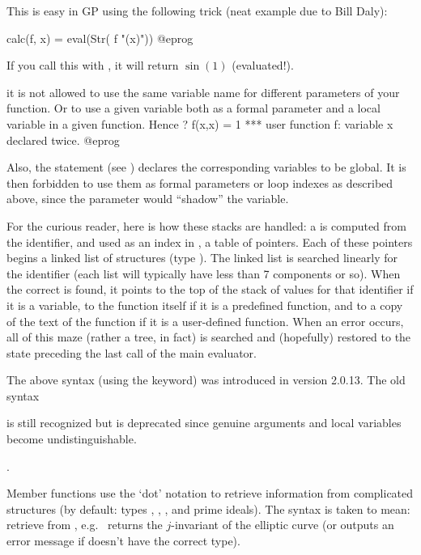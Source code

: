  This is easy
in GP using the following trick (neat example due to Bill Daly):

\bprog
calc(f, x) = eval(Str( f "(x)"))
@eprog

\noindent If you call this with , it will
return $\sin(1)$ (evaluated!).

 it is not allowed to use the same
variable name for different parameters of your function. Or to use a given
variable both as a formal parameter and a local variable in a given function.
Hence
\bprog
? f(x,x) = 1
  ***   user function f: variable x declared twice.
@eprog

Also, the statement  (see
) declares the corresponding variables to be global. It
is then forbidden to use them as formal parameters or loop indexes as
described above, since the parameter would ``shadow'' the variable.

 For the curious reader, here is how these
stacks are handled: a  is computed from the identifier,
and used as an index in , a table of pointers. Each of
these pointers begins a linked list of structures (type ).
The linked list is searched linearly for the identifier (each list will
typically have less than 7 components or so). When the correct 
is found, it points to the top of the stack of values for that identifier if
it is a variable, to the function itself if it is a predefined function, and
to a copy of the text of the function if it is a user-defined function. When
an error occurs, all of this maze (rather a tree, in fact) is searched and
(hopefully) restored to the state preceding the last call of the main
evaluator.

 The above syntax (using the  keyword) was
introduced in version 2.0.13. The old syntax

%

\noindent is still recognized but is deprecated since genuine arguments and
local variables become undistinguishable.

.

Member functions use the `dot' notation to retrieve information from
complicated structures (by default: types , , ,
 and prime ideals). The syntax  is taken to
mean: retrieve  from , e.g.~ returns
the $j$-invariant of the elliptic curve  (or outputs an error
message if  doesn't have the correct type).

